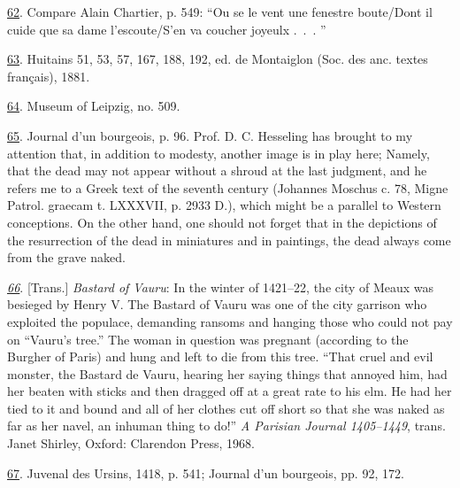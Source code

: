 \protect\hypertarget{23_NOTES.xhtmlux5cux23id_189}{\protect\hyperlink{21_Chapter_Thirteen__IMAGE_AND_WORD.xhtmlux5cux23id_188}{62}}.
Compare Alain Chartier, p. 549: ``Ou se le vent une fenestre boute/Dont
il cuide que sa dame l'escoute/S'en va coucher joyeulx .~.~. ''

\protect\hypertarget{23_NOTES.xhtmlux5cux23id_187}{\protect\hyperlink{21_Chapter_Thirteen__IMAGE_AND_WORD.xhtmlux5cux23id_186}{63}}.
Huitains 51, 53, 57, 167, 188, 192, ed. de Montaiglon (Soc. des anc.
textes français), 1881.

\protect\hypertarget{23_NOTES.xhtmlux5cux23id_185}{\protect\hyperlink{21_Chapter_Thirteen__IMAGE_AND_WORD.xhtmlux5cux23id_184}{64}}.
Museum of Leipzig, no. 509.

\protect\hypertarget{23_NOTES.xhtmlux5cux23id_183}{\protect\hyperlink{21_Chapter_Thirteen__IMAGE_AND_WORD.xhtmlux5cux23id_182}{65}}.
Journal d'un bourgeois, p. 96. Prof. D. C. Hesseling has brought to my
attention that, in addition to modesty, another image is in play here;
Namely, that the dead may not appear without a shroud at the last
judgment, and he refers me to a Greek text of the seventh century
(Johannes Moschus c. 78, Migne Patrol. graecam t. LXXXVII, p. 2933 D.),
which might be a parallel to Western conceptions. On the other hand, one
should not forget that in the depictions of the resurrection of the dead
in miniatures and in paintings, the dead always come from the grave
naked.

\emph{\protect\hypertarget{23_NOTES.xhtmlux5cux23id_181}{\protect\hyperlink{21_Chapter_Thirteen__IMAGE_AND_WORD.xhtmlux5cux23id_180}{66}}}.
{[}Trans.{]} \emph{Bastard of Vauru}: In the winter of 1421--22, the
city of Meaux was
\protect\hypertarget{23_NOTES.xhtmlux5cux23page_438}{}{}besieged by
Henry V. The Bastard of Vauru was one of the city garrison who exploited
the populace, demanding ransoms and hanging those who could not pay on
``Vauru's tree.'' The woman in question was pregnant (according to the
Burgher of Paris) and hung and left to die from this tree. ``That cruel
and evil monster, the Bastard de Vauru, hearing her saying things that
annoyed him, had her beaten with sticks and then dragged off at a great
rate to his elm. He had her tied to it and bound and all of her clothes
cut off short so that she was naked as far as her navel, an inhuman
thing to do!'' \emph{A Parisian Journal 1405--1449}, trans. Janet
Shirley, Oxford: Clarendon Press, 1968.

\protect\hypertarget{23_NOTES.xhtmlux5cux23id_179}{\protect\hyperlink{21_Chapter_Thirteen__IMAGE_AND_WORD.xhtmlux5cux23id_178}{67}}.
Juvenal des Ursins, 1418, p. 541; Journal d'un bourgeois, pp. 92, 172.

